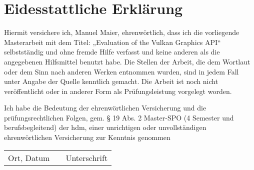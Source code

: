 
\chapter*{Eidesstattliche Erklärung}

Hiermit versichere ich, Manuel Maier, ehrenwörtlich, dass ich die vorliegende Masterarbeit mit dem Titel: „Evaluation of the Vulkan Graphics API“ selbstständig und ohne fremde Hilfe verfasst und keine anderen als die angegebenen Hilfsmittel benutzt habe.
Die Stellen der Arbeit, die dem Wortlaut oder dem Sinn nach anderen Werken entnommen wurden, sind in jedem Fall unter Angabe der Quelle kenntlich gemacht.
Die Arbeit ist noch nicht veröffentlicht oder in anderer Form als Prüfungsleistung vorgelegt worden.

Ich habe die Bedeutung der ehrenwörtlichen Versicherung und die prüfungsrechtlichen Folgen, gem. § 19 Abs. 2 Master-SPO (4 Semester und berufsbegleitend) der \acrshort{hdm}, einer unrichtigen oder unvollständigen ehrenwörtlichen Versicherung zur Kenntnis genommen

\vspace{\fill}

\begin{tabu} to \linewidth { X[3] X X[3] }
  \hhline{-~-}
  {\small Ort, Datum} & & {\small Unterschrift}
\end{tabu}
